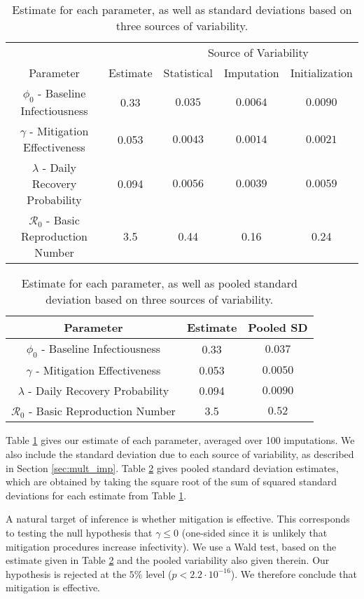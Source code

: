 \documentclass[11pt, oneside]{article}   	%
\newcommand{\RO}{\mathscr{R}_0}	%
\begin{document}
\begin{table}
	\centering
	\caption{Estimate for each parameter, as well as standard deviations based on three sources of variability.}
	\label{tab:estimates}
	\begin{tabular}{c|c|ccc}
		&&\multicolumn{3}{c}{Source of Variability}\\
		Parameter & Estimate & Statistical & Imputation & Initialization\\
		\hline
		$\phi_0$ - Baseline Infectiousness & 0.33 & $0.035 $ & $0.0064$ & $0.0090$\\
		$\gamma$ - Mitigation Effectiveness & 0.053 & $0.0043$ & $0.0014$ & $0.0021$\\
		$\lambda$ - Daily Recovery Probability & 0.094 & $0.0056$ & $0.0039$ & $0.0059$\\
		$\RO$ - Basic Reproduction Number & 3.5 & 0.44 & 0.16 & 0.24
	\end{tabular}
\end{table}

\begin{table}
	\centering
	\caption{Estimate for each parameter, as well as pooled standard deviation based on three sources of variability.}
	\label{tab:estimates_pooled}
	\begin{tabular}{c|c|c}
		Parameter & Estimate & Pooled SD\\
		\hline
		$\phi_0$ - Baseline Infectiousness & 0.33 & $0.037$\\
		$\gamma$ - Mitigation Effectiveness & 0.053 & $0.0050$\\
		$\lambda$ - Daily Recovery Probability & 0.094 & $0.0090$\\
		$\RO$ - Basic Reproduction Number & 3.5 & $0.52$
	\end{tabular}
\end{table}

Table \ref{tab:estimates} gives our estimate of each parameter, averaged over 100 imputations. We also include the standard deviation due to each source of variability, as described in Section \ref{sec:mult_imp}. Table \ref{tab:estimates_pooled} gives pooled standard deviation estimates, which are obtained by taking the square root of the sum of squared standard deviations for each estimate from Table \ref{tab:estimates}.

A natural target of inference is whether mitigation is effective. This corresponds to testing the null hypothesis that $\gamma \leq 0$ (one-sided since it is unlikely that mitigation procedures increase infectivity). We use a Wald test, based on the estimate given in Table \ref{tab:estimates_pooled} and the pooled variability also given therein. Our hypothesis is rejected at the $5\%$ level ($p < 2.2 \cdot 10^{-16} $). We therefore conclude that mitigation is effective.
\end{document}
